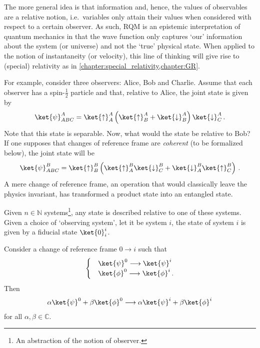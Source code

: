     The more general idea is that information and, hence, the values of observables are a relative notion, i.e.~variables only attain their values when considered with respect to a certain observer. As such, RQM is an epistemic interpretation of quantum mechanics in that the wave function only captures `our' information about the system (or universe) and not the `true' physical state. When applied to the notion of instantaneity (or velocity), this line of thinking will give rise to (special) relativity as in \cref{chapter:special_relativity,chapter:GR}.


    For example, consider three observers: Alice, Bob and Charlie. Assume that each observer has a spin-$\tfrac{1}{2}$ particle and that, relative to Alice, the joint state is given by
    \begin{gather}
        \ket{\psi}^A_{ABC} = \ket{\uparrow}^A_A\left(\ket{\uparrow}^A_B+\ket{\downarrow}^A_B\right)\ket{\downarrow}^A_C\,.
    \end{gather}
    Note that this state is separable. Now, what would the state be relative to Bob? If one supposes that changes of reference frame are \textit{coherent} (to be formalized below), the joint state will be
    \begin{gather}
        \ket{\psi}^B_{ABC} = \ket{\uparrow}^B_B\left(\ket{\uparrow}^B_A\ket{\downarrow}^B_C+\ket{\downarrow}^B_A\ket{\uparrow}^B_C\right)\,.
    \end{gather}
    A mere change of reference frame, an operation that would classically leave the physics invariant, has transformed a product state into an entangled state.

    \begin{axiom}
        Given $n\in\mathbb{N}$ systems\footnote{An abstraction of the notion of observer.}, any state is described relative to one of these systems. Given a choice of `observing system', let it be system $i$, the state of system $i$ is given by a fiducial state $\ket{0}^i_i$.
    \end{axiom}

    \begin{axiom}
        Consider a change of reference frame $0\longrightarrow i$ such that
        \begin{gather}
            \begin{cases}
                &\ket{\psi}^0\longrightarrow\ket{\psi}^i\\
                &\ket{\phi}^0\longrightarrow\ket{\phi}^i\,.
            \end{cases}
        \end{gather}
        Then
        \begin{gather}
            \alpha\ket{\psi}^0+\beta\ket{\phi}^0\longrightarrow\alpha\ket{\psi}^i+\beta\ket{\phi}^i
        \end{gather}
        for all $\alpha,\beta\in\mathbb{C}$.
    \end{axiom}


